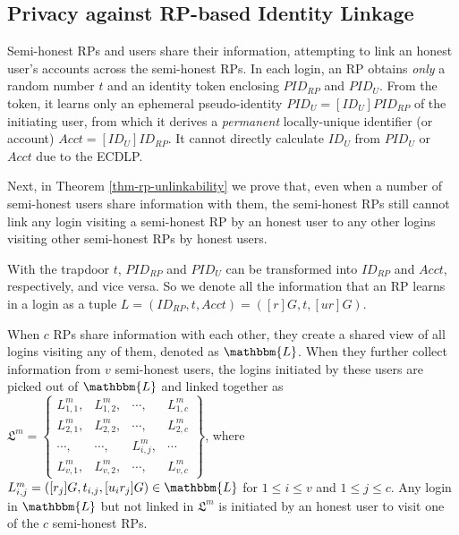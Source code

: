 \vspace{1.5mm}


\subsection{Privacy against RP-based Identity Linkage}
\label{subsec:RP-privacy}

Semi-honest RPs and users share their information, attempting to 
link an honest user's accounts across the semi-honest RPs.
%
In each login, an RP obtains \emph{only} a random number $t$ and an identity token enclosing $PID_{RP}$ and $PID_U$. From the token, it learns only an ephemeral pseudo-identity $PID_{U} = [{ID_U}]{PID_{RP}}$ of the initiating user, from which it derives a \emph{permanent} locally-unique identifier (or account) $Acct = [ID_U]ID_{RP}$.
It cannot directly calculate $ID_U$ from $PID_{U}$ or $Acct$ due to the ECDLP.

Next, in Theorem \ref{thm-rp-unlinkability} we prove that, 
even when a number of semi-honest users share information with them,
the semi-honest RPs still cannot link any login visiting a semi-honest RP by an honest user to any other logins visiting other semi-honest RPs by honest users.


With the trapdoor $t$, $PID_{RP}$ and $PID_U$ can be transformed into $ID_{RP}$ and $Acct$, respectively, and vice versa.
So we denote all the information that an RP learns in a login as a tuple $L =(ID_{RP}, t, Acct)=([r]G, t, [ur]G)$.

When $c$ RPs share information with each other, they create a shared view of all logins visiting any of them, denoted as $\mathbbm{L}$.
When they further collect information from $v$ semi-honest users, the logins initiated by these users are picked out of $\mathbbm{L}$ and linked together as
$\mathfrak{L}^m=\left \{ \begin{matrix}
L^m_{1,1},&L^m_{1,2},&\cdots,&L^m_{1,c}\\
L^m_{2,1},& L^m_{2,2},&\cdots,&L^m_{2,c}\\
\cdots,&\cdots,&L^m_{i,j},&\cdots\\
L^m_{v,1},&L^m_{v,2},&\cdots,&L^m_{v,c}
\end{matrix}\right\}$,
where $L^m_{i, j}=([r_j]G, t_{i,j}, [u_ir_j]G) \in \mathbbm{L}$ for $1 \le i \le v$ and $1 \le j \le c$. Any login in $\mathbbm{L}$ but not linked in $\mathfrak{L}^m$ is initiated by an honest user to visit one of the $c$ semi-honest RPs.

